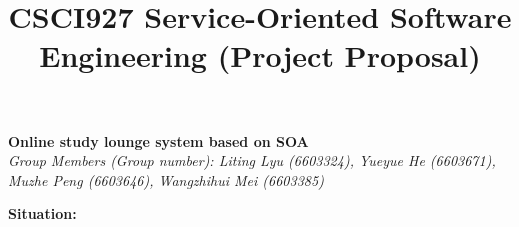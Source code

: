 \documentclass[runningheads]{llncs}
\begin{document}
\title{\large{CSCI927 Service-Oriented Software Engineering (Project Proposal)}}
\author{}
\institute{}
\maketitle
\vspace{-1cm}



\begin{center}
\Large{\textbf{Online study lounge system based on SOA}} \\ %
\vspace{0.2cm}
\large{\emph{Group Members (Group number): Liting Lyu (6603324), Yueyue  He (6603671), Muzhe Peng (6603646), Wangzhihui Mei (6603385)}} \\%
\vspace{0.3cm}
\end{center}

\noindent 
\textbf{Situation:} 
\end{document}
